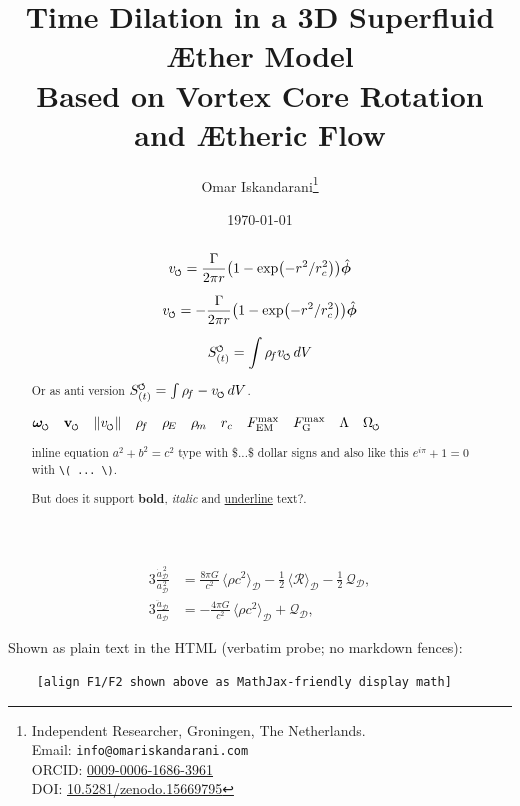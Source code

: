 \documentclass{article}
\title{Time Dilation in a 3D Superfluid Æther Model\\  Based on Vortex Core Rotation and Ætheric Flow }
\author{
    Omar Iskandarani\thanks{
        Independent Researcher, Groningen, The Netherlands.\\
        Email: \texttt{info@omariskandarani.com}\\
        ORCID: \href{https://orcid.org/0009-0006-1686-3961}{0009-0006-1686-3961}\\
        DOI: \href{https://doi.org/10.5281/zenodo.15669902}{10.5281/zenodo.15669795}
    }
}
\date{\today}
\newcommand{\vswirl}{v_{\mkern-2mu\scriptscriptstyle\boldsymbol{\circlearrowleft}}}
\newcommand{\vswirlcw}{-\vswirl}
\newcommand{\omegas}{\boldsymbol{\omega}_{\mkern-2mu\scriptscriptstyle\boldsymbol{\circlearrowleft}}}  %
\newcommand{\vscore}{\mathbf{v}_{\mkern-2mu\scriptscriptstyle\boldsymbol{\circlearrowleft}}}                    %
\newcommand{\vnorm}{\lVert \vswirl \rVert}               %
\newcommand{\rhof}{\rho_{\!f}}                           %
\newcommand{\rhoE}{\rho_{\!E}}                           %
\newcommand{\rhom}{\rho_{\!m}}                           %
\newcommand{\rc}{r_c}                                    %
\newcommand{\FmaxEM}{F_{\mathrm{EM}}^{\max}}             %
\newcommand{\FmaxG}{F_{\mathrm{G}}^{\max}}               %
\newcommand{\Lam}{\Lambda}                               %
\newcommand{\Om}{\Omega_{\mkern-2mu\scriptscriptstyle\boldsymbol{\circlearrowleft}}}                   %
\begin{document}
    \maketitle

    \begin{abstract}

        \begin{equation}
            \vswirl = \frac{\Gamma}{2\pi r}\bigl(1-\exp(-r^2/\rc^2)\bigr)\hat{\bm{\phi}}
        \end{equation}

        \[ \vswirl = -\frac{\Gamma}{2\pi r}\bigl(1-\exp(-r^2/\rc^2)\bigr)\hat{\bm{\phi}}\]


        \begin{equation}
            S_{(t)}^{\mkern-2mu\scriptscriptstyle\boldsymbol{\circlearrowleft}} = \int \rhof \vswirl \, dV
        \end{equation}

        Or as anti version \(S_{(t)}^{\mkern-2mu\scriptscriptstyle\boldsymbol{\circlearrowleft}} = \int \rhof \vswirlcw \, dV\).

        $\omegas\quad \vscore\quad \vnorm\quad \rhof\quad \rhoE\quad \rhom\quad \rc\quad \FmaxEM\quad \FmaxG\quad \Lam\quad \Om$

        inline equation $a^2 + b^2 = c^2$ type with \$...\$ dollar signs
        and also like this \(e^{i\pi} + 1 = 0\) with \texttt{\textbackslash( ... \textbackslash)}.

        But does it support \textbf{bold}, \textit{italic} and \underline{underline} text?.

    \end{abstract}

    \begin{align}
        3\frac{\dot a_\mathcal{D}^{\,2}}{a_\mathcal{D}^{\,2}}
        &= \frac{8\pi G}{c^2}\,\langle \rho c^2 \rangle_\mathcal{D}
        - \tfrac{1}{2}\,\langle \mathcal{R} \rangle_\mathcal{D}
        - \tfrac{1}{2}\,\mathcal{Q}_\mathcal{D}, \tag{F1}\label{F1}\\
        3\frac{\ddot a_\mathcal{D}}{a_\mathcal{D}}
        &= -\frac{4\pi G}{c^2}\,\langle \rho c^2 \rangle_\mathcal{D}
        + \mathcal{Q}_\mathcal{D}, \tag{F2}\label{F2}
    \end{align}


    Shown as plain text in the HTML (verbatim probe; no markdown fences):
    \begin{verbatim}
    [align F1/F2 shown above as MathJax-friendly display math]
    \end{verbatim}
\end{document}
